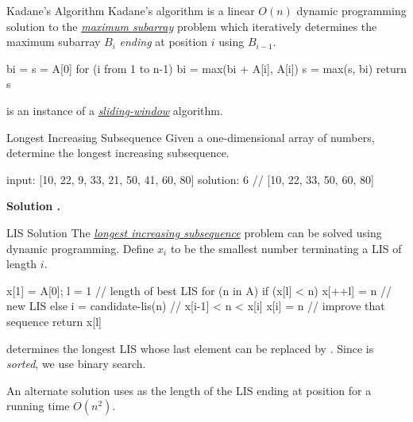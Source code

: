 \documentclass{cognito}
\begin{document}
\begin{note}{Kadane's Algorithm}
	Kadane's algorithm is a linear $O(n)$ dynamic programming solution to the \hyperref[note:Maximum Subarray Problem]{\it maximum subarray} problem
	which iteratively determines the maximum subarray $B_i$ {\it ending} at position $i$ using $B_{i-1}$.

\begin{largecode}
 bi = s = A[0]
 for (i from 1 to n-1)
 	bi = max(bi + A[i], A[i])
	s = max(s, bi)
 return s
\end{largecode}
	\begin{remark}  is an instance of a \hyperref[note:Sliding Window Method]{\it sliding-window} algorithm.\end{remark} \vspace{-5pt}
\end{note}

\begin{note}{Longest Increasing Subsequence}
	Given a one-dimensional array of numbers, determine the longest increasing subsequence.
	\begin{largecode}
 input: [10, 22, 9, 33, 21, 50, 41, 60, 80]
 solution: 6  // [10, 22, 33, 50, 60, 80]
	\end{largecode}	
	
	\bf Solution \hyperref[note:LIS Solution]{\solutionref}.
\end{note}

\begin{note}{LIS Solution}
	The \hyperref[note:Longest Increasing Subsequence]{\it longest increasing subsequence} problem can be solved
	using dynamic programming. Define $x_i$ to be the smallest number terminating a LIS of length $i$.
	\begin{largecode}
 x[1] = A[0];  l = 1          // length of best LIS
 for (n in A)
 	if (x[l] < n) x[++l] = n  // new LIS
	else
		i = candidate-lis(n)  // x[i-1] < n < x[i]
		x[i] = n              // improve that sequence
 return x[l]
	\end{largecode}
	 determines the longest LIS whose last element can be replaced by .
	Since  is \emph{sorted}, we use binary search.
	\begin{remark} An alternate solution uses  as the length of the LIS ending at position  for a running time $O(n^2)$.\end{remark} \vspace{-5pt}
\end{note}
\end{document}
